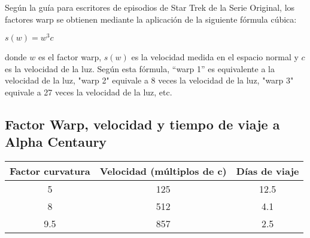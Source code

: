 \documentclass[letterpaper,11pt]{article}
\begin{document}
Según la guía para escritores de episodios de Star Trek de la Serie Orig\-inal, los factores 
warp se obtienen mediante la aplicación de la siguiente fórmula cúbica:

\begin{center}
    $s(w) = w^3c$
\end{center}

donde $w$ es el factor warp, $s(w)$ es la velocidad medida en el espacio normal y $c$ es la 
velocidad de la luz. Según esta fórmula, ``warp 1'' es equivalente a la velocidad de la 
luz, "warp 2" equivale a 8 veces la velocidad de la luz, "warp 3" equivale a 27 veces 
la velocidad de la luz, etc.

\subsection{Factor Warp, velocidad y tiempo de viaje a Alpha Cen\-tau\-ry}

\begin{tabular}{ccc}
	\hline
	Factor curvatura & Velocidad (múltiplos de c) & Días de viaje \\
	\hline
	5  & 125 &  12.5   \\
	8  &  512 &  4.1    \\
	9.5 &   857 & 2.5 \\
	\hline
\end{tabular}
\end{document}
